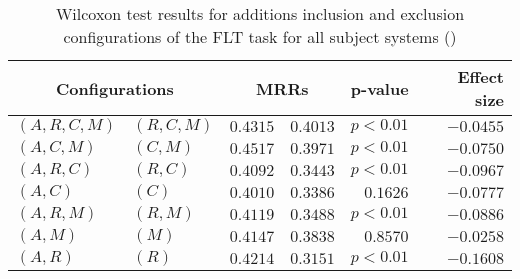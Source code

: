 
\begin{table}
\begin{spacing}{1.2}
\centering
\caption{Wilcoxon test results for additions inclusion and exclusion configurations of the FLT task for all subject systems (\ctwo)}
\label{table:versus-wilcox-all-flt-additions}
\begin{tabular}{ll|rr|rr}
\toprule
      \multicolumn{2}{c|}{Configurations} &                \multicolumn{2}{c|}{MRRs} &        p-value & Effect size \\
\midrule
 $(A,R,C,M)$ &  $(R,C,M)$ &  $\bm{0.4315}$ &  $0.4013$ & $p<0.01$ &   $-0.0455$ \\
   $(A,C,M)$ &    $(C,M)$ &  $\bm{0.4517}$ &  $0.3971$ & $p<0.01$ &   $-0.0750$ \\
   $(A,R,C)$ &    $(R,C)$ &  $\bm{0.4092}$ &  $0.3443$ & $p<0.01$ &   $-0.0967$ \\
     $(A,C)$ &      $(C)$ &  $\bm{0.4010}$ &  $0.3386$ & $0.1626$ &   $-0.0777$ \\
   $(A,R,M)$ &    $(R,M)$ &  $\bm{0.4119}$ &  $0.3488$ & $p<0.01$ &   $-0.0886$ \\
     $(A,M)$ &      $(M)$ &  $\bm{0.4147}$ &  $0.3838$ & $0.8570$ &   $-0.0258$ \\
     $(A,R)$ &      $(R)$ &  $\bm{0.4214}$ &  $0.3151$ & $p<0.01$ &   $-0.1608$ \\
\bottomrule
\end{tabular}

\end{spacing}
\end{table}

